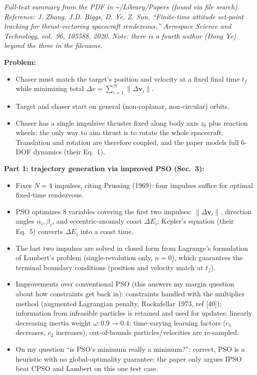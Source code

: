 \documentclass[11pt]{article}
\begin{document}
\textit{Full-text summary from the PDF in \textasciitilde/Library/Papers (found via file search). Reference: J. Zhang, J.D. Biggs, D. Ye, Z. Sun, ``Finite-time attitude set-point tracking for thrust-vectoring spacecraft rendezvous,'' Aerospace Science and Technology, vol.\ 96, 105588, 2020. Note: there is a fourth author (Dong Ye) beyond the three in the filename.}

\textbf{Problem:}
\begin{itemize}[noitemsep]
    \item Chaser must match the target's position and velocity at a fixed final time $t_f$ while minimizing total $\Delta v = \sum_{i=1}^{N} \|\Delta \mathbf{v}_i\|$.
    \item Target and chaser start on general (non-coplanar, non-circular) orbits.
    \item Chaser has a single impulsive thruster fixed along body axis $z_b$ plus reaction wheels: the only way to aim thrust is to rotate the whole spacecraft. Translation and rotation are therefore coupled, and the paper models full 6-DOF dynamics (their Eq.\ 1).
\end{itemize}

\textbf{Part 1: trajectory generation via improved PSO (Sec.\ 3):}
\begin{itemize}[noitemsep]
    \item Fixes $N = 4$ impulses, citing Prussing (1969): four impulses suffice for optimal fixed-time rendezvous.
    \item PSO optimizes 8 variables covering the first two impulses: $\|\Delta \mathbf{v}_i\|$, direction angles $\alpha_i, \beta_i$, and eccentric-anomaly coast $\Delta E_i$; Kepler's equation (their Eq.\ 5) converts $\Delta E_i$ into a coast time.
    \item The last two impulses are solved in closed form from Lagrange's formulation of Lambert's problem (single-revolution only, $n=0$), which guarantees the terminal boundary conditions (position and velocity match at $t_f$).
    \item Improvements over conventional PSO (this answers my margin question about how constraints get back in): constraints handled with the multiplier method (augmented Lagrangian penalty, Rockafellar 1973, ref [40]); information from infeasible particles is retained and used for updates; linearly decreasing inertia weight $\omega: 0.9 \rightarrow 0.4$; time-varying learning factors ($c_1$ decreases, $c_2$ increases); out-of-bounds particles/velocities are re-sampled.
    \item On my question ``is PSO's minimum really a minimum?'': correct, PSO is a heuristic with no global-optimality guarantee; the paper only argues IPSO beat CPSO and Lambert on this one test case.
\end{itemize}
\end{document}
